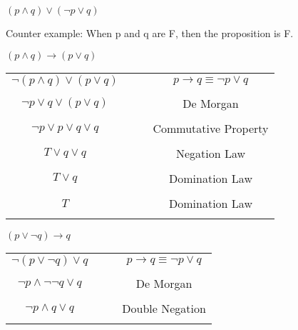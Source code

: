 \documentclass[11pt,largemargins]{homework}
\begin{document}
\newpage
\question
  \begin{alphaparts}
    \questionpart
    $(p \land q) \lor (\neg p \lor q)$

    Counter example: When p and q are F, then the proposition is F.

    \questionpart
    $(p \land q) \rightarrow ( p \lor q)$

    
    \begin{tabular}{cccc}
      \\ 
      $\neg (p \land q) \lor ( p \lor q)$ &&& $p \rightarrow q \equiv \neg p \lor q$ \\
      &&& \\
      
      $\neg p \lor q \lor ( p \lor q)$ &&& De Morgan \\
      &&& \\

      $\neg p \lor p \lor q \lor q$ &&& Commutative Property \\
      &&& \\

      $T \lor q \lor q$ &&& Negation Law \\
      &&& \\

      $T \lor q$ &&& Domination Law \\
      &&& \\

      $T$ &&& Domination Law \\
      &&& \\      
    \end{tabular}

    \questionpart
      $(p \lor \neg q) \rightarrow q$

        
      \begin{tabular}{cccc}
        \\ 
        $\neg (p \lor \neg q) \lor q$ &&& $p \rightarrow q \equiv \neg p \lor q$ \\
        &&& \\
        
        $\neg p \land \neg \neg q \lor q$ &&& De Morgan \\
        &&& \\

        $\neg p \land q \lor q$ &&& Double Negation \\
        
        \\      
      \end{tabular}


\end{alphaparts}
\end{document}
